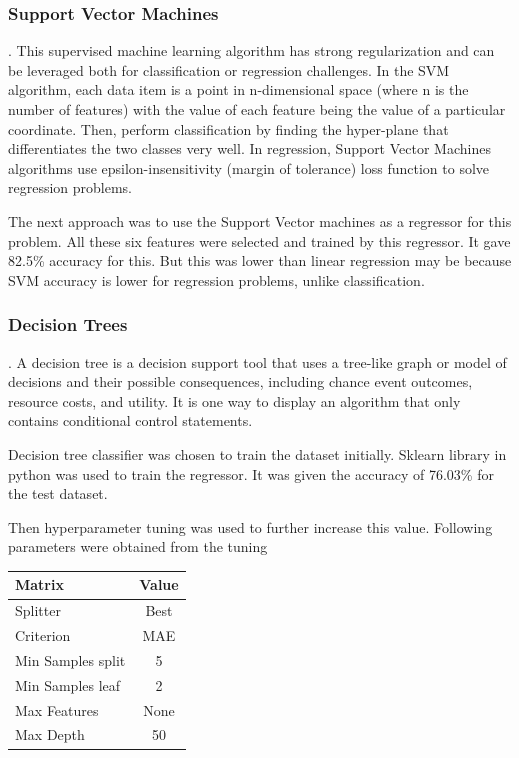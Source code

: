 \subsubsection{Support Vector Machines}.
This supervised machine learning algorithm has strong regularization and can be leveraged both for classification or regression challenges. In the SVM algorithm, each data item is a point in n-dimensional space (where n is the number of features) with the value of each feature being the value of a particular coordinate. Then, perform classification by finding the hyper-plane that differentiates the two classes very well. In regression, Support Vector Machines algorithms use epsilon-insensitivity (margin of tolerance) loss function to solve regression problems.

The next approach was to use the Support Vector machines as a regressor for this problem. All these six features were selected and trained by this regressor. It gave 82.5\% accuracy for this. But this was lower than linear regression may be because SVM accuracy is lower for regression problems, unlike classification. \\


\subsubsection{Decision Trees}.
A decision tree is a decision support tool that uses a tree-like graph or model of decisions and their possible consequences, including chance event outcomes, resource costs, and utility. It is one way to display an algorithm that only contains conditional control statements.

Decision tree classifier was chosen to train the dataset initially. Sklearn library in python was used to train the regressor. It was given the accuracy of 76.03\% for the test dataset. 

Then hyperparameter tuning was used to further increase this value. Following parameters were obtained from the tuning


\begin{center}
\begin{tabular}{ |l|c| } 
 \hline
 Matrix & Value  \\ 
 \hline
 Splitter & Best  \\
 Criterion & MAE  \\
 Min Samples split & 5  \\
 Min Samples leaf & 2  \\
 Max Features & None  \\
 Max Depth & 50  \\

 \hline
\end{tabular}
\end{center}

